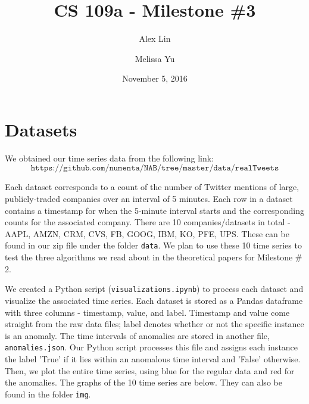\documentclass[11pt, margin=1in]{article}
\begin{document}
\title{CS 109a - Milestone \#3}
\author{Alex Lin \and Melissa Yu}
\date{November 5, 2016}
\maketitle

\section{Datasets}

We obtained our time series data from the following link:
$$\texttt{https://github.com/numenta/NAB/tree/master/data/realTweets}$$ 

Each dataset corresponds to a count of the number of Twitter mentions of large, publicly-traded companies over an interval of 5 minutes.  Each row in a dataset contains a timestamp for when the 5-minute interval starts and the corresponding counts for the associated company.  There are 10 companies/datasets in total - AAPL, AMZN, CRM, CVS, FB, GOOG, IBM, KO, PFE, UPS.  These can be found in our zip file under the folder \texttt{data}.  We plan to use these 10 time series to test the three algorithms we read about in the theoretical papers for Milestone \# 2.  

We created a Python script (\texttt{visualizations.ipynb}) to process each dataset and visualize the associated time series.  Each dataset is stored as a Pandas dataframe with three columns - timestamp, value, and label.  Timestamp and value come straight from the raw data files; label denotes whether or not the specific instance is an anomaly.  The time intervals of anomalies are stored in another file, \texttt{anomalies.json}.  Our Python script processes this file and assigns each instance the label 'True' if it lies within an anomalous time interval and 'False' otherwise.  Then, we plot the entire time series, using blue for the regular data and red for the anomalies.  The graphs of the 10 time series are below.  They can also be found in the folder \texttt{img}.
\end{document}
